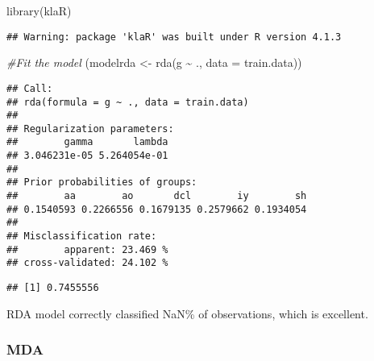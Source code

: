 \documentclass[
]{article}
\newenvironment{Shaded}{\begin{snugshade}}{\end{snugshade}}
\newcommand{\AttributeTok}[1]{\textcolor[rgb]{0.77,0.63,0.00}{#1}}
\newcommand{\CommentTok}[1]{\textcolor[rgb]{0.56,0.35,0.01}{\textit{#1}}}
\newcommand{\FunctionTok}[1]{\textcolor[rgb]{0.00,0.00,0.00}{#1}}
\newcommand{\NormalTok}[1]{#1}
\newcommand{\OtherTok}[1]{\textcolor[rgb]{0.56,0.35,0.01}{#1}}
\newcommand{\SpecialCharTok}[1]{\textcolor[rgb]{0.00,0.00,0.00}{#1}}
\begin{document}
\begin{Shaded}
\begin{Highlighting}[]
\FunctionTok{library}\NormalTok{(klaR)}
\end{Highlighting}
\end{Shaded}

\begin{verbatim}
## Warning: package 'klaR' was built under R version 4.1.3
\end{verbatim}

\begin{Shaded}
\begin{Highlighting}[]
\CommentTok{\#Fit the model}
\NormalTok{(modelrda }\OtherTok{\textless{}{-}} \FunctionTok{rda}\NormalTok{(g }\SpecialCharTok{\textasciitilde{}}\NormalTok{ ., }\AttributeTok{data =}\NormalTok{ train.data))}
\end{Highlighting}
\end{Shaded}

\begin{verbatim}
## Call: 
## rda(formula = g ~ ., data = train.data)
## 
## Regularization parameters: 
##        gamma       lambda 
## 3.046231e-05 5.264054e-01 
## 
## Prior probabilities of groups: 
##        aa        ao       dcl        iy        sh 
## 0.1540593 0.2266556 0.1679135 0.2579662 0.1934054 
## 
## Misclassification rate: 
##        apparent: 23.469 %
## cross-validated: 24.102 %
\end{verbatim}

\begin{Shaded}
\end{Shaded}

\begin{verbatim}
## [1] 0.7455556
\end{verbatim}

RDA model correctly classified NaN\% of observations, which is
excellent.

\hypertarget{mda}{%
\subsubsection{MDA}\label{mda}}
\end{document}

